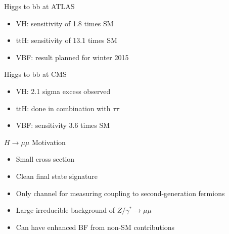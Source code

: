 \documentclass{beamer}
\begin{document}
\begin{frame}{Higgs to bb at ATLAS}
	\begin{itemize}
		\item VH: sensitivity of 1.8 times SM
		\item ttH: sensitivity of 13.1 times SM
		\item VBF: result planned for winter 2015
	\end{itemize}
\end{frame}


\begin{frame}{Higgs to bb at CMS}
	\begin{itemize}
		\item VH: 2.1 sigma excess observed
		\item ttH: done in combination with $\tau \tau$
		\item VBF: sensitivity 3.6 times SM
	\end{itemize}
\end{frame}



\begin{frame}{$H\rightarrow\mu \mu$ Motivation}
	\begin{itemize}
		\item Small cross section
		\item Clean final state signature
		\item Only channel for measuring coupling to second-generation fermions
		\item Large irreducible background of $Z/\gamma^*\rightarrow\mu\mu$
		\item Can have enhanced BF from non-SM contributions
	\end{itemize}
\end{frame}
\end{document}
